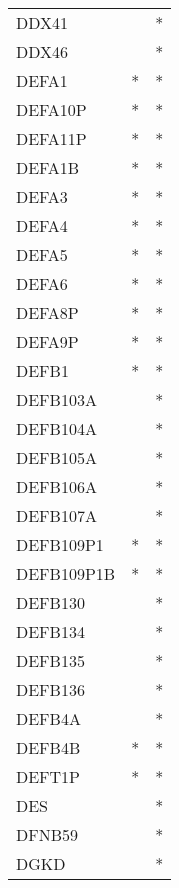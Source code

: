 \begin{longtable}{lcc}
DDX41           &                &          * \\
DDX46           &                &          * \\
DEFA1           &              * &          * \\
DEFA10P         &              * &          * \\
DEFA11P         &              * &          * \\
DEFA1B          &              * &          * \\
DEFA3           &              * &          * \\
DEFA4           &              * &          * \\
DEFA5           &              * &          * \\
DEFA6           &              * &          * \\
DEFA8P          &              * &          * \\
DEFA9P          &              * &          * \\
DEFB1           &              * &          * \\
DEFB103A        &                &          * \\
DEFB104A        &                &          * \\
DEFB105A        &                &          * \\
DEFB106A        &                &          * \\
DEFB107A        &                &          * \\
DEFB109P1       &              * &          * \\
DEFB109P1B      &              * &          * \\
DEFB130         &                &          * \\
DEFB134         &                &          * \\
DEFB135         &                &          * \\
DEFB136         &                &          * \\
DEFB4A          &                &          * \\
DEFB4B          &              * &          * \\
DEFT1P          &              * &          * \\
DES             &                &          * \\
DFNB59          &                &          * \\
DGKD            &                &          * \\

\end{longtable}
